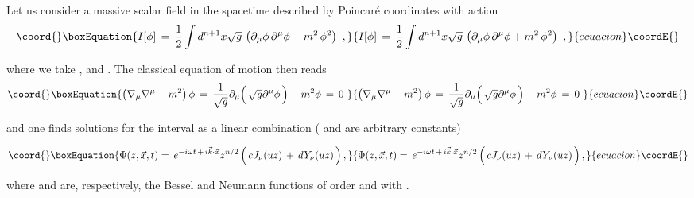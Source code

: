 \documentclass[a4paper,12pt]{article}
\begin{document}
Let us  consider a massive scalar field \myHighlight{$\phi$}\coordHE{} in the \coordHE{}
spacetime described by Poincar\'e coordinates with action
\begin{equation}\coord{}\boxEquation{
\label{action1}
I[\phi ]\,=\, {1\over 2} \int d^{n+1}x \sqrt{g}\,
\left(\partial_\mu \phi \, \partial^\mu \phi
+m^2\,\phi^2 \right)
\,\,,
}{
I[\phi ]\,=\, {1\over 2} \int d^{n+1}x \sqrt{g}\,
\left(\partial_\mu \phi \, \partial^\mu \phi
+m^2\,\phi^2 \right)
\,\,,
}{ecuacion}\coordE{}\end{equation}
  
\noindent where we take \coordHE{},
\coordHE{} and \coordHE{}.
The classical equation of motion then reads                                                                                                                                                                                                                                                                                                                                                                                                          
\begin{equation}\coord{}\boxEquation{
\label{motion}
\left(\nabla_\mu \nabla^\mu - m^2\right) \phi\,
=\,{1\over \sqrt{g}} 
\partial_\mu 
\Big( \, \sqrt{g} \partial^\mu \phi \,\Big) 
- m^2\phi\,=\,0\,\,
}{
\left(\nabla_\mu \nabla^\mu - m^2\right) \phi\,
=\,{1\over \sqrt{g}} 
\partial_\mu 
\Big( \, \sqrt{g} \partial^\mu \phi \,\Big) 
- m^2\phi\,=\,0\,\,
}{ecuacion}\coordE{}\end{equation}

\noindent and one finds solutions\cite{BKL,BKLT} for the interval
\coordHE{} as a linear combination (\coordHE{} and \coordHE{} are arbitrary
constants)

\begin{equation}\coord{}\boxEquation{
\label{Sol1}
\Phi(z, \vec x , t) =\, e^{-i\omega t\,+\,i\vec k \cdot \vec x} z^{n/2} 
\,\Big( \, c J_{\nu}(u z) \,+\, d Y_{\nu}(u z) \,\Big)\,,
}{
\Phi(z, \vec x , t) =\, e^{-i\omega t\,+\,i\vec k \cdot \vec x} z^{n/2} 
\,\Big( \, c J_{\nu}(u z) \,+\, d Y_{\nu}(u z) \,\Big)\,,
}{ecuacion}\coordE{}\end{equation}

\noindent where \coordHE{} and \coordHE{} are, respectively, 
the Bessel and Neumann functions of order \coordHE{} and 
\coordHE{} with 
\coordHE{}.
\end{document}
